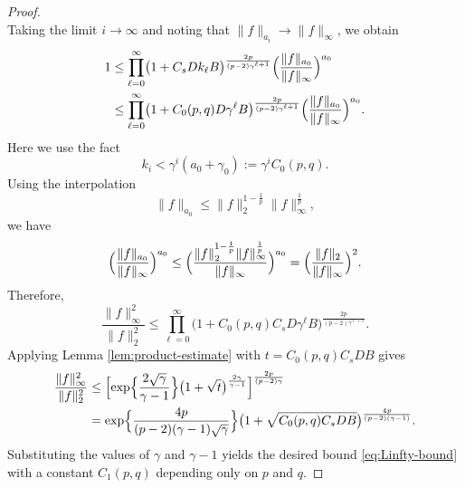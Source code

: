 \documentclass[10pt,a4paper]{amsart}
\begin{document}
\begin{proof}
{\[		\]    
		Taking the limit \(i\to\infty\) and noting that \(\|f\|_{a_i} \to \|f\|_\infty\), we obtain
		\begin{align*}
		1 &\le \prod_{\ell=0}^{\infty} \bigl(1 + C_s D k_\ell B\bigr)^{\frac{2p}{(p-2)\gamma^{\ell+1}}}
		\Bigl(\frac{\|f\|_{a_0}}{\|f\|_\infty}\Bigr)^{a_0} \\
		&\le \prod_{\ell=0}^{\infty} \bigl(1 + C_0(p,q) D \gamma^{\ell} B\bigr)^{\frac{2p}{(p-2)\gamma^{\ell+1}}}
		\Bigl(\frac{\|f\|_{a_0}}{\|f\|_\infty}\Bigr)^{a_0}.
		\end{align*}    
		Here we use the fact
		\[k_{i}<\gamma^{i}(a_{0}+\gamma_{0}):=\gamma^{i}C_{0}(p,q).\]
		Using the interpolation 
		$$\|f\|_{a_0} \le \|f\|_2^{1-\frac{1}{p}} \|f\|_\infty^{\frac{1}{p}},$$ we have
		\[
		\Bigl(\frac{\|f\|_{a_0}}{\|f\|_\infty}\Bigr)^{a_0}
		\le \Bigl(\frac{\|f\|_2^{1-\frac{1}{p}} \|f\|_\infty^{\frac{1}{p}}}{\|f\|_\infty}\Bigr)^{a_0}
		= \Bigl(\frac{\|f\|_2}{\|f\|_\infty}\Bigr)^{2}.
		\]
		Therefore,
		\[
		\frac{\|f\|_\infty^2}{\|f\|_2^2}
		\le \prod_{\ell=0}^{\infty} 
		\bigl(1 + C_{0}(p,q)C_s D \gamma^{\ell} B\bigr)^{\frac{2p}{(p-2)\gamma^{\ell+1}}}.
		\]
	}Applying Lemma \ref{lem:product-estimate} with \(t = C_0(p,q)C_s D B\) gives
		\begin{equation*}
		\begin{split}
		\frac{\|f\|_\infty^2}{\|f\|_2^2}
		&\le\Bigl [\exp\Bigl\{\frac{2\sqrt{\gamma}}{\gamma-1}\Bigr\}
		\bigl(1+\sqrt{t}\bigr)^{\frac{2\gamma}{\gamma-1}}\Bigr]^{\frac{2p}{(p-2)\gamma}}\\
		&=\exp\Bigl\{\frac{4p}{(p-2)(\gamma-1)\sqrt{\gamma}}\Bigr\}
		\bigl(1 + \sqrt{C_{0}(p,q)C_s D B}\bigr)^{\frac{4p}{(p-2)(\gamma-1)}}.		
		\end{split}
		\end{equation*}
		Substituting the values of \(\gamma\) and \(\gamma-1\) yields the desired bound \eqref{eq:Linfty-bound} with a constant \(C_1(p,q)\) depending only on \(p\) and \(q\).
	\end{proof}
\end{document}
